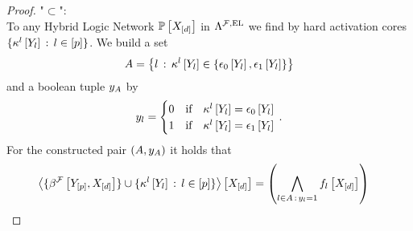 \begin{proof}
    "$\subset$":\\
    To any Hybrid Logic Network $\mathbb{P}\left[X_{[d]}\right]$ in $\Lambda^{\mathcal{F},\mathrm{EL}}$ we find by  hard activation cores $\{\kappa^{l}\left[Y_{l}\right]\,:\,l\in[p]\}$.
    We build a set
    \begin{align*}
        A =
        \left\{l\,:\,\kappa^{l}\left[Y_{l}\right]\in\{\epsilon_0\left[Y_{l}\right],\epsilon_1\left[Y_{l}\right]\}\right\}
    \end{align*}
    and a boolean tuple $y_{A}$ by
    \begin{align*}
        y_{l} =
        \begin{cases}
            0 & \text{if} \quad \kappa^{l}\left[Y_{l}\right]=\epsilon_0\left[Y_{l}\right] \\
            1 & \text{if} \quad \kappa^{l}\left[Y_{l}\right]=\epsilon_1\left[Y_{l}\right] \\
        \end{cases} \, .
    \end{align*}
    For the constructed pair $(A,y_{A})$ it holds that
    \begin{align*}
        \contractionof{\{\bencodingofat{\mlnstat}{\sstatheadvariables,\shortcatvariables}\}
        \cup \{\kcoreofat{\selindex}{\headvariableof{\selindex}} \wcols \selindexin\}
        }{\shortcatvariables}
        &=
        \left(\bigwedge_{\selindex\in\variableset\wcols\headindexof{\selindex}=1} \enumformulaat{\shortcatvariables}\right)

\end{align*}
\end{proof}
